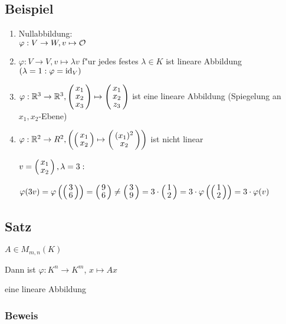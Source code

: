 \subsection{Beispiel}
\begin{enumerate}
	\item
	Nullabbildung:\\
	$\varphi: V \rightarrow W, v \mapsto \mathcal{O}$
	\item
	$\varphi : V \rightarrow V, v \mapsto \lambda v$ f"ur jedes festes $\lambda \in K$ ist lineare Abbildung $(\lambda = 1: \varphi = \mathrm{ id }_V )$
	\item
	$\varphi : \R^3 \rightarrow \R^3, \vct{x_1\\ x_2\\ x_3}\mapsto \vct{x_1 \\ x_2 \\ z_3}$ ist eine lineare Abbildung (Spiegelung an $x_1, x_2$-Ebene) 
	\item
	$\varphi : \R^ 2 \rightarrow R^2, \left(	\vct{x_1 \\ x_2} \mapsto \vct{(x_1)^2 \\ x_2 }\right)$ ist nicht linear
	
	$v= \vct{x_1 \\ x_2}, \lambda =3:$
	
	 $\varphi(3v)= \varphi\left(\vct{3 \\ 6}\right)=  \vct{9 \\ 6} \neq \vct{3 \\ 9} = 3 \cdot \vct{1\\2}= 3 \cdot \varphi \left(\vct{1\\2} \right) = 3 \cdot \varphi(v)$
	 \\

\end{enumerate}

\subsection{Satz}

$A \in M_{m,n}(K)$

Dann ist $\varphi: K^n \rightarrow K^m$, $x \mapsto Ax$

eine lineare Abbildung \bigskip

\subsubsection*{Beweis}

